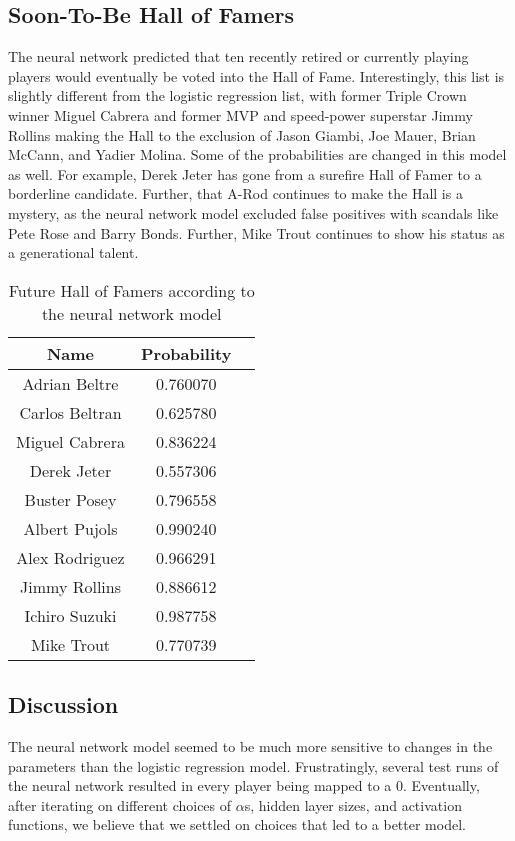 \documentclass{sigkddExp}
\begin{document}
\subsection{Soon-To-Be Hall of Famers}
The neural network predicted that ten recently retired or currently playing players would eventually be voted into the Hall of Fame. Interestingly, this list is slightly different from the logistic regression list, with former Triple Crown winner Miguel Cabrera and former MVP and speed-power superstar Jimmy Rollins making the Hall to the exclusion of Jason Giambi, Joe Mauer, Brian McCann, and Yadier Molina. Some of the probabilities are changed in this model as well. For example, Derek Jeter has gone from a surefire Hall of Famer to a borderline candidate. Further, that A-Rod continues to make the Hall is a mystery, as the neural network model excluded false positives with scandals like Pete Rose and Barry Bonds. Further, Mike Trout continues to show his status as a generational talent.

\begin{table}
\caption{Future Hall of Famers according to the neural network model}
\begin{tabular} {|c|c|l|} \hline
Name&Probability\\ \hline
Adrian Beltre&0.760070\\ \hline
Carlos Beltran&0.625780\\ \hline
Miguel Cabrera&0.836224\\ \hline
Derek Jeter&0.557306\\ \hline
Buster Posey&0.796558\\ \hline
Albert Pujols&0.990240\\ \hline
Alex Rodriguez&0.966291\\ \hline
Jimmy Rollins&0.886612\\ \hline
Ichiro Suzuki&0.987758\\ \hline
Mike Trout&0.770739\\ \hline
\end{tabular}
\end{table}

\subsection{Discussion}
The neural network model seemed to be much more sensitive to changes in the parameters than the logistic regression model. Frustratingly, several test runs of the neural network resulted in every player being mapped to a 0. Eventually, after iterating on different choices of $\alpha$s, hidden layer sizes, and activation functions, we believe that we settled on choices that led to a better model.
\end{document}
